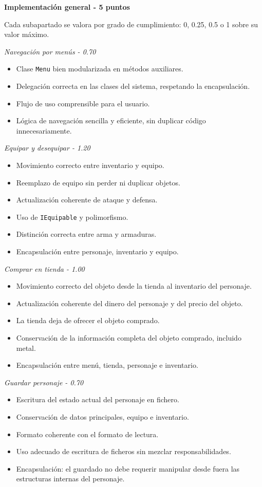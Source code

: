 \documentclass[10pt,a4paper]{article}
\newcommand{\bloque}[2]{\vspace{3pt}\textbf{#1\if\relax\detokenize{#2}\relax\else{} - #2\fi}\par}
\newcommand{\subbloque}[2]{\textit{#1 - #2}\par}
\begin{document}
\bloque{Implementación general}{5 puntos}
Cada subapartado se valora por grado de cumplimiento: 0, 0.25, 0.5 o 1 sobre su valor máximo.

\subbloque{Navegación por menús}{0.70}
\begin{itemize}
    \item Clase \texttt{Menu} bien modularizada en métodos auxiliares.
    \item Delegación correcta en las clases del sistema, respetando la encapsulación.
    \item Flujo de uso comprensible para el usuario.
    \item Lógica de navegación sencilla y eficiente, sin duplicar código innecesariamente.
\end{itemize}
\subbloque{Equipar y desequipar}{1.20}
\begin{itemize}
    \item Movimiento correcto entre inventario y equipo.
    \item Reemplazo de equipo sin perder ni duplicar objetos.
    \item Actualización coherente de ataque y defensa.
    \item Uso de \texttt{IEquipable} y polimorfismo.
    \item Distinción correcta entre arma y armaduras.
    \item Encapsulación entre personaje, inventario y equipo.
\end{itemize}
\subbloque{Comprar en tienda}{1.00}
\begin{itemize}
    \item Movimiento correcto del objeto desde la tienda al inventario del personaje.
    \item Actualización coherente del dinero del personaje y del precio del objeto.
    \item La tienda deja de ofrecer el objeto comprado.
    \item Conservación de la información completa del objeto comprado, incluido metal.
    \item Encapsulación entre menú, tienda, personaje e inventario.
\end{itemize}
\subbloque{Guardar personaje}{0.70}
\begin{itemize}
    \item Escritura del estado actual del personaje en fichero.
    \item Conservación de datos principales, equipo e inventario.
    \item Formato coherente con el formato de lectura.
    \item Uso adecuado de escritura de ficheros sin mezclar responsabilidades.
    \item Encapsulación: el guardado no debe requerir manipular desde fuera las estructuras internas del personaje.
\end{itemize}
\end{document}
